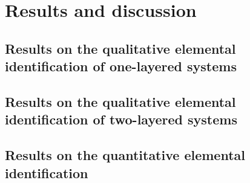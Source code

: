 


\chapter{Results and discussion} %

\label{Chapter4}



\section{Results on the qualitative elemental identification of one-layered systems}


\section{Results on the qualitative elemental identification of two-layered systems}


\section{Results on the quantitative elemental identification}


